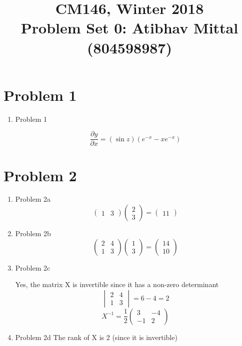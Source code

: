 \documentclass[11pt]{article}
\newcommand{\cnum}{CM146}
\newcommand{\ced}{Winter 2018}
\newcommand{\ctitle}[3]{\title{\vspace{-0.5in}\cnum, \ced\\Problem Set #1: #2}}
\newcommand{\solution}[1]{{{\color{blue}{\bf Solution:} {#1}}}}
\begin{document}
\ctitle{0}{Atibhav Mittal (804598987)}
\title{}
\author{}
\date{}
\maketitle
\vspace{-0.75in}

\section{Problem 1}
\begin{enumerate}
\item Problem 1 \newline

\solution{}
\[
	\frac{\partial y}{\partial x} = (\sin{z}) (e^{-x} - xe^{-x})
\]
\vspace{10cm}
\end{enumerate}

\newpage
\section{Problem 2}

\begin{enumerate}
\item Problem 2a \newline
\solution{}
$$
\begin{pmatrix}
1 & 3
\end{pmatrix}
\begin{pmatrix}
2 \\
3
\end{pmatrix}
= 
\begin{pmatrix}
11
\end{pmatrix}
$$

\item Problem 2b \newline
\solution{}
$$
\begin{pmatrix}
2 & 4 \\
1 & 3
\end{pmatrix}
\begin{pmatrix}
1 \\
3
\end{pmatrix}
=
\begin{pmatrix}
14 \\
10
\end{pmatrix}
$$

\item Problem 2c \newline
\solution{}

Yes, the matrix X is invertible since it has a non-zero determinant \break
$$
\begin{vmatrix}
2 & 4 \\
1 & 3
\end{vmatrix}
= 6 - 4 = 2 
$$
$$
X^{-1} = \frac{1}{2}
\begin{pmatrix}
3 & -4 \\
-1 & 2
\end{pmatrix}
$$

\item Problem 2d \newline
\solution{}
The rank of X is 2 (since it is invertible)
\end{enumerate}
\end{document}
